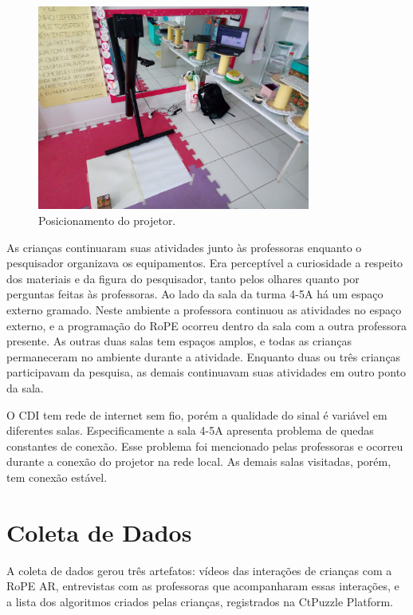 \begin{figure}[!h]
    \centering
    \includegraphics[width=0.8\textwidth,fbox]{figs/setting_projector.jpg}
    \caption{Posicionamento do projetor.}
    \label{fig:setting}
\end{figure}

As crianças continuaram suas atividades junto às professoras enquanto o pesquisador organizava os equipamentos. Era perceptível a curiosidade a respeito dos materiais e da figura do pesquisador, tanto pelos olhares quanto por perguntas feitas às professoras. Ao lado da sala da turma 4-5A há um espaço externo gramado. Neste ambiente a professora continuou as atividades no espaço externo, e a programação do RoPE ocorreu dentro da sala com a outra professora presente. As outras duas salas tem espaços amplos, e todas as crianças permaneceram no ambiente durante a atividade. Enquanto duas ou três crianças participavam da pesquisa, as demais continuavam suas atividades em outro ponto da sala.
 
O CDI tem rede de internet sem fio, porém a qualidade do sinal é variável em diferentes salas. Especificamente a sala 4-5A apresenta problema de quedas constantes de conexão. Esse problema foi mencionado pelas professoras e ocorreu durante a conexão do projetor na rede local. As demais salas visitadas, porém, tem conexão estável.

\section{Coleta de Dados}
\label{sec:protocolo}
A coleta de dados gerou três artefatos: vídeos das interações de crianças com a RoPE AR, entrevistas com as professoras que acompanharam essas interações, e a lista dos algoritmos criados pelas crianças, registrados na CtPuzzle Platform. 

